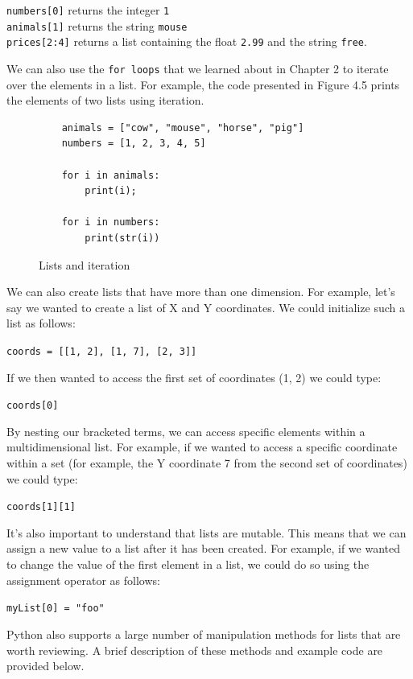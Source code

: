 \documentclass{book}
\begin{document}
\texttt{numbers[0]} returns the integer \texttt{1}\\
\texttt{animals[1]} returns the string \texttt{mouse}\\
\texttt{prices[2:4]} returns a list containing the float \texttt{2.99} and the string \texttt{free}.

We can also use the \texttt{for loops} that we learned about in Chapter 2 to iterate over the elements in a list. For example, the code presented in Figure 4.5 prints the elements of two lists using iteration. 

\begin{figure}[h]
	\caption{Lists and iteration}
	\begin{lstlisting}
	animals = ["cow", "mouse", "horse", "pig"]
	numbers = [1, 2, 3, 4, 5]

	for i in animals:
		print(i);

	for i in numbers:
		print(str(i))
	\end{lstlisting}
\end{figure}

We can also create lists that have more than one dimension. For example, let's say we wanted to create a list of X and Y coordinates. We could initialize such a list as follows:

\texttt{coords = [[1, 2], [1, 7], [2, 3]]}
	
If we then wanted to access the first set of coordinates (1, 2) we could type:

\texttt{coords[0]}

By nesting our bracketed terms, we can access specific elements within a multidimensional list. For example, if we wanted to access a specific coordinate within a set (for example, the Y coordinate 7 from the second set of coordinates) we could type:

\texttt{coords[1][1]}

It's also important to understand that lists are mutable. This means that we can assign a new value to a list after it has been created. For example, if we wanted to change the value of the first element in a list, we could do so using the assignment operator as follows:

\texttt{myList[0] = "foo"}

Python also supports a large number of manipulation methods for lists that are worth reviewing. A brief description of these methods and example code are provided below.
\end{document}
